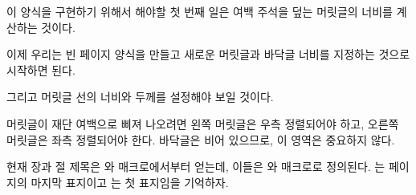 이 양식을 구현하기 위해서 해야할 첫 번째 일은 여백 주석을
덮는 머릿글의 너비를 계산하는 것이다.
\begin{lcode}
\setlength{\headwidth}{\textwidth}
  \addtolength{\headwidth}{\marginparsep}
  \addtolength{\headwidth}{\marginparwidth}
\end{lcode}
이제 우리는 빈  페이지 양식을 만들고 새로운
머릿글과 바닥글 너비를 지정하는 것으로
시작하면 된다.
\begin{lcode}
\end{lcode}
그리고 머릿글 선의 너비와 두께를 설정해야 보일 것이다.
\begin{lcode}
\end{lcode}

머릿글이 재단 여백으로 삐져 나오려면 왼쪽
머릿글은 우측 정렬되어야 하고, 오른쪽
머릿글은 좌측 정렬되어야 한다.
바닥글은 비어 있으므로, 이 영역은 중요하지 않다.
\begin{lcode}
\end{lcode}

현재 장과 절 제목은 \cmd{\leftmark}와 \cmd{\rightmark} 매크로에서부터 얻는데,
이들은 \cmd{\chaptermark}와 \cmd{\sectionmark} 매크로로 정의된다.
\cmd{\leftmark}는 페이지의 마지막  표지이고 \cmd{\rightmark}는 첫
 표지임을 기억하자.

